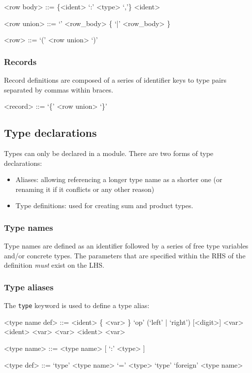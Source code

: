 \begin{grammar}
<row body> ::= \{<ident> `:' <type> `,'\}
          \alt <ident>
          
<row union> ::= `'
           \alt <row_body> \{ `|' <row_body> \}

<row>      ::= `(' <row union> `)'
\end{grammar}


\subsubsection{Records}
Record definitions are composed of a series of identifier keys to type pairs separated by commas within braces.

\begin{grammar}
<record>      ::= `\{' <row union> `\}'
\end{grammar}

\subsection{Type declarations}
Types can only be declared in a module. There are two forms of type declarations:

\begin{itemize}
\item Aliases: allowing referencing a longer type name as a shorter one (or renaming it if it conflicts or any other reason)
\item Type definitions: used for creating sum and product types.
\end{itemize}

\subsubsection{Type names}
Type names are defined as an identifier followed by a series of free type variables and/or concrete types.
The parameters that are specified within the RHS of the definition \textit{must} exist on the LHS.

\subsubsection{Type aliases}
The \texttt{type} keyword is used to define a type alias:

\begin{grammar}
<type name def> ::= <ident> \{ <var> \} 
               \alt `op' (`left' | `right') [<digit>] <var> <ident> <var>
               \alt <var> \lit{\`{}} <ident> \lit{\`{}} <var>

<type name>     ::= <type name>  [ `:' <type> ]

<type def> ::= `type' <type name> `=' <type>
          \alt `type' `foreign' <type name>
\end{grammar}

